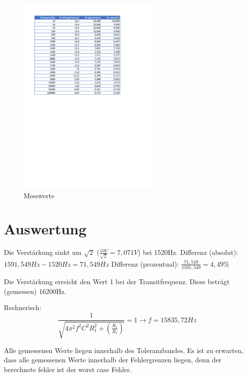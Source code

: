 \begin{figure}[H]
    \centering
    \includegraphics[height=10cm]{images/Versuch6/Tabelle.pdf} 
    \caption{Messwerte}
    \label{fig: Messwerte}
\end{figure}

\section{Auswertung}
Die Verstärkung sinkt um $\sqrt{2}$ ($\frac{10V}{\sqrt{2}} = 7,071V$) bei 1520Hz.
Differenz (absolut): $1591,549Hz - 1520Hz = 71,549Hz$
Differenz (prozentual): $\frac{71,549}{1591,549} = 4,49\%$

Die Verstärkung erreicht den Wert 1 bei der Transitfrequenz. Diese
beträgt (gemessen) 16200Hz.

Rechnerisch: 
\[
    \frac{1}{\sqrt{4 \pi^2 f^2 C^2 R_1^2 + (\frac{R_1}{R_2})}} = 1 \rightarrow f = 15835,72Hz
\]

Alle gemessenen Werte liegen innerhalb des Toleranzbandes.
Es ist zu erwarten, dass alle gemessenen Werte innerhalb der 
Fehlergrenzen liegen, denn der berechnete fehler ist der 
worst case Fehler.